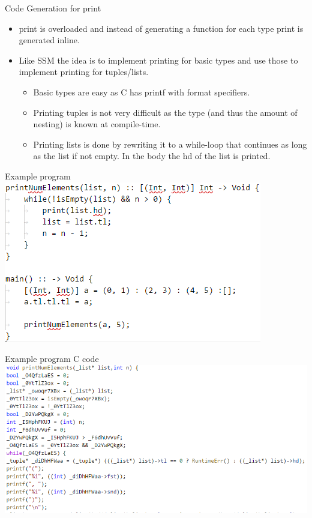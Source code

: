 \documentclass[10pt]{beamer}
\begin{document}
\begin{frame}{Code Generation for print}
    \begin{itemize}
        \item print is overloaded and instead of generating a function for each type print is generated inline.
        \item Like SSM the idea is to implement printing for basic types and use those to implement printing for tuples/lists.
        \begin{itemize}
            \item Basic types are easy as C has printf with format specifiers.
            \item Printing tuples is not very difficult as the type (and thus the amount of nesting) is known at compile-time.
            \item Printing lists is done by rewriting it to a while-loop that continues as long as the list if not empty. In the body the hd of the list is printed.
        \end{itemize}
    \end{itemize}
\end{frame}

\begin{frame}{Example program}
\includegraphics[width=\textwidth]{presentation4/7.png}
\end{frame}

\begin{frame}{Example program C code}
\includegraphics[width=\textwidth]{presentation4/8.png}
\end{frame}
\end{document}
